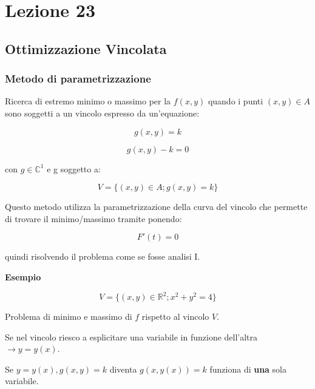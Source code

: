 \documentclass[../appunti-analisi.tex]{subfiles}
\begin{document}
\section{Lezione 23}

\subsection{Ottimizzazione Vincolata}

\subsubsection{Metodo di parametrizzazione} 

Ricerca di estremo minimo o massimo per la $f(x,y)$ quando i punti $(x,y) \in A$ sono soggetti a un vincolo espresso da un'equazione:

\[
    g(x,y) = k
\]

\[
    g(x,y) -k = 0
\]

con $g \in \mathbb{C}^{1}$ e g soggetto a:

\[
    V= \{(x,y) \in A; g(x,y) =k\}
\]

Questo metodo utilizza la parametrizzazione della curva del vincolo che permette di trovare il minimo/massimo tramite ponendo:

\[
    F'(t) = 0
\]

quindi risolvendo il problema come se fosse analisi I.

\newpage

\textbf{Esempio} 

\[
    V = \{(x,y) \in \mathbb{R}^{2}; x^{2}+y^{2}=4\}
\]

\begin{center}
\end{center}

Problema di minimo e massimo di $f$ rispetto al vincolo $V$.

Se nel vincolo riesco a esplicitare una variabile in funzione dell'altra $\rightarrow y=y(x)$.

Se $y=y(x),g(x,y) = k$ diventa $g(x,y(x))=k$ funziona di \textbf{una} sola variabile.
\end{document}
